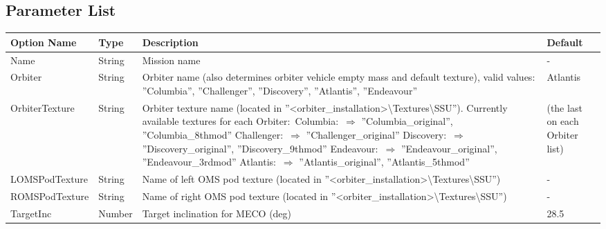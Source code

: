 \documentclass[Space_Shuttle_Ultra_Manual.tex]{subfiles}
\begin{document}
\newpage

\subsection{Parameter List}
  \begin{longtable}{|l|p{1.5cm}|p{7.5cm}|p{2.0cm}|}
	\hline
	\rule{0pt}{2ex}
	\textbf{Option Name} & \textbf{Type} & \textbf{Description} & \textbf{Default}\\
	\hline
	\rule{0pt}{2ex}
	Name & String & Mission name & -\\
	\hline
	\rule{0pt}{2ex}
	Orbiter & String & Orbiter name (also determines orbiter vehicle empty mass and default texture), valid values$\colon$ ''Columbia'', ''Challenger'', ''Discovery'', ''Atlantis'', ''Endeavour'' & Atlantis\\
	\hline
	\rule{0pt}{2ex}
	OrbiterTexture & String & Orbiter texture name (located in ''<orbiter\_installation>\textbackslash Textures\textbackslash SSU''). Currently available textures for each Orbiter$\colon$ \newline
Columbia$\colon$ \newline
$\Rightarrow$ ''Columbia\_original'', ''Columbia\_8thmod''\newline
Challenger$\colon$\newline
$\Rightarrow$ ''Challenger\_original''\newline
Discovery$\colon$\newline
$\Rightarrow$ ''Discovery\_original'', ''Discovery\_9thmod''\newline
Endeavour$\colon$\newline
$\Rightarrow$ ''Endeavour\_original'', ''Endeavour\_3rdmod''\newline
Atlantis$\colon$\newline
$\Rightarrow$ ''Atlantis\_original'', ''Atlantis\_5thmod''	& (the last on each Orbiter list)\\
	\hline
	\rule{0pt}{2ex}
	LOMSPodTexture & String & Name of left OMS pod texture (located in ''<orbiter\_installation>\textbackslash Textures\textbackslash SSU'') & -\\
	\hline
	\rule{0pt}{2ex}
	ROMSPodTexture & String & Name of right OMS pod texture (located in ''<orbiter\_installation>\textbackslash Textures\textbackslash SSU'') & -\\
	\hline
	\rule{0pt}{2ex}
	TargetInc & Number & Target inclination for MECO (deg) & 28.5\\

\end{longtable}
\end{document}
